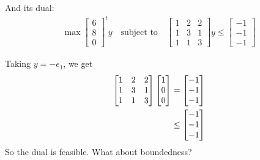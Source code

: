 \documentclass{article}
\begin{document}
\begin{example}
	And its dual:
	\begin{align*}
		\max \begin{bmatrix} 6 \\ 8 \\ 0 \end{bmatrix}^t y \quad \text{subject to} \quad
		\begin{bmatrix}
			1 & 2 & 2 \\
			1 & 3 & 1 \\
			1 & 1 & 3
		\end{bmatrix} y \le \begin{bmatrix} -1 \\ -1 \\ -1 \end{bmatrix}
	\end{align*}

	Taking $y = -e_1$, we get
	\begin{align*}
		\begin{bmatrix}
			1 & 2 & 2 \\
			1 & 3 & 1 \\
			1 & 1 & 3
		\end{bmatrix} \begin{bmatrix} \-1 \\ 0 \\ 0 \end{bmatrix}
		&= \begin{bmatrix} -1 \\ -1 \\ -1 \end{bmatrix} \\
		&\le \begin{bmatrix} -1 \\ -1 \\ -1 \end{bmatrix}
	\end{align*}
	So the dual is feasible. What about boundedness?
\end{example}
\end{document}
